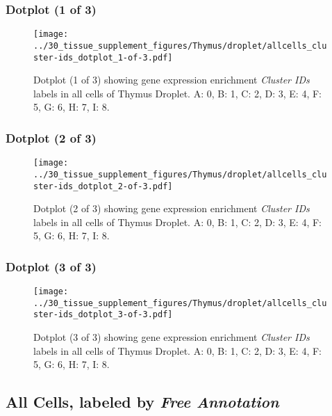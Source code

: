 \clearpage

\subsubsection{Dotplot (1 of 3)}
\begin{figure}[h]
\centering
\texttt{[image: ../30\_tissue\_supplement\_figures/Thymus/droplet/allcells\_cluster-ids\_dotplot\_1-of-3.pdf]}

\caption{ Dotplot (1 of 3)  showing gene expression enrichment \emph{Cluster IDs} labels in all cells of Thymus Droplet. A: 0, B: 1, C: 2, D: 3, E: 4, F: 5, G: 6, H: 7, I: 8.}
\end{figure}


\clearpage

\subsubsection{Dotplot (2 of 3)}
\begin{figure}[h]
\centering
\texttt{[image: ../30\_tissue\_supplement\_figures/Thymus/droplet/allcells\_cluster-ids\_dotplot\_2-of-3.pdf]}

\caption{ Dotplot (2 of 3)  showing gene expression enrichment \emph{Cluster IDs} labels in all cells of Thymus Droplet. A: 0, B: 1, C: 2, D: 3, E: 4, F: 5, G: 6, H: 7, I: 8.}
\end{figure}


\clearpage

\subsubsection{Dotplot (3 of 3)}
\begin{figure}[h]
\centering
\texttt{[image: ../30\_tissue\_supplement\_figures/Thymus/droplet/allcells\_cluster-ids\_dotplot\_3-of-3.pdf]}

\caption{ Dotplot (3 of 3)  showing gene expression enrichment \emph{Cluster IDs} labels in all cells of Thymus Droplet. A: 0, B: 1, C: 2, D: 3, E: 4, F: 5, G: 6, H: 7, I: 8.}
\end{figure}


\clearpage

\subsection{All Cells, labeled by \emph{Free Annotation}}
